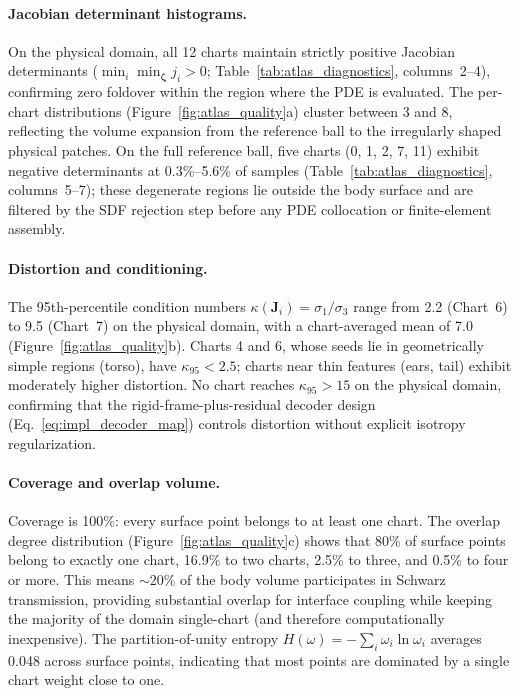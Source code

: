 \documentclass[sort&compress]{svjour3} %
\begin{document}
\paragraph{Jacobian determinant histograms.}
On the physical domain, all 12 charts maintain strictly positive Jacobian determinants ($\min_i\min_{\boldsymbol{\zeta}} j_i>0$; Table~\ref{tab:atlas_diagnostics}, columns~2--4), confirming zero foldover within the region where the PDE is evaluated.
The per-chart distributions (Figure~\ref{fig:atlas_quality}a) cluster between 3 and 8, reflecting the volume expansion from the reference ball to the irregularly shaped physical patches.
On the full reference ball, five charts (0, 1, 2, 7, 11) exhibit negative determinants at 0.3\%--5.6\% of samples (Table~\ref{tab:atlas_diagnostics}, columns~5--7); these degenerate regions lie outside the body surface and are filtered by the SDF rejection step before any PDE collocation or finite-element assembly.

\paragraph{Distortion and conditioning.}
The 95th-percentile condition numbers $\kappa(\mathbf{J}_i)=\sigma_1/\sigma_3$ range from 2.2 (Chart~6) to 9.5 (Chart~7) on the physical domain, with a chart-averaged mean of 7.0 (Figure~\ref{fig:atlas_quality}b).
Charts 4 and 6, whose seeds lie in geometrically simple regions (torso), have $\kappa_{95}<2.5$; charts near thin features (ears, tail) exhibit moderately higher distortion.
No chart reaches $\kappa_{95}>15$ on the physical domain, confirming that the rigid-frame-plus-residual decoder design (Eq.~\eqref{eq:impl_decoder_map}) controls distortion without explicit isotropy regularization.

\paragraph{Coverage and overlap volume.}
Coverage is 100\%: every surface point belongs to at least one chart.
The overlap degree distribution (Figure~\ref{fig:atlas_quality}c) shows that 80\% of surface points belong to exactly one chart, 16.9\% to two charts, 2.5\% to three, and 0.5\% to four or more.
This means ${\sim}20\%$ of the body volume participates in Schwarz transmission, providing substantial overlap for interface coupling while keeping the majority of the domain single-chart (and therefore computationally inexpensive).
The partition-of-unity entropy $H(\omega)=-\sum_i\omega_i\ln\omega_i$ averages 0.048 across surface points, indicating that most points are dominated by a single chart weight close to one.
\end{document}
